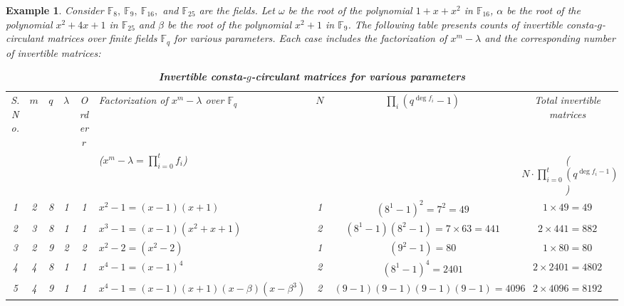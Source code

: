 \documentclass[12pt]{article}
\newtheorem{example}{Example}
\begin{document}
\begin{example}
Consider $\mathbb{F}_{8},~\mathbb{F}_{9},~\mathbb{F}_{16},$ and $\mathbb{F}_{25}$ are the fields. Let $\omega$ be the  root of the polynomial $1+x+x^2$ in $\mathbb{F}_{16}$, $\alpha$ be the root of the polynomial $x^2+4x+1$ in $\mathbb{F}_{25}$ and $\beta$ be the root of the polynomial $x^2+1$ in $\mathbb{F}_9$. 
The following table presents counts of invertible consta-$g$-circulant matrices over finite fields $\mathbb{F}_q$ for various parameters. Each case includes the factorization of $x^m - \lambda$ and the corresponding number of invertible matrices:

\begin{table}[ht]
	\centering
	\caption{\textbf{\textit{ Invertible consta-$g$-circulant matrices for various parameters}}}
	\label{6tab:consta_g_circulant_10}
	\vspace{.3cm}
	
	\tiny{\begin{tabular}{|c|c|c|c|c|l|c|c|c|}
		\hline
		S. No.&\(m\) & \(q\) & \(\lambda\) & Order \(r\) & Factorization of \(x^m-\lambda\) over \(\mathbb{F}_q\) & \(N\) & \(\prod_i (q^{\deg f_i} -1)\) & Total invertible matrices\\&~&~&~&~&($x^m-\lambda=\prod_{i=0}^{t}f_{i
		
		}$)&~&~&($N\cdot\prod_{i=0}^{t}(q^{\deg f_i-1})$) \\ \hline
		
		1&2 & 8  & 1 & 1 & \(x^2 - 1 = (x-1)(x+1)\)                         & 1 & \((8^1-1)^2 = 7^2=49\)               & \(1 \times 49 = 49\) \\ \hline
		
		2&3 & 8  & 1 & 1 & \(x^3 - 1 = (x-1)(x^2 + x +1)\)                  & 2 & \((8^1-1)(8^2-1) = 7 \times 63 = 441\) & \(2 \times 441 = 882\) \\ \hline
		
		3&2 & 9  & 2 & 2 & \(x^2 - 2 = (x^2-2)\)                  & 1 & \((9^2-1)   = 80\) & \(1 \times 80 = 80\) \\ \hline
		
		4&4 & 8  & 1 & 1 & \(x^4 - 1 = (x-1)^4\) & 2 & \((8^1-1)^4 = 2401 \) & \(2 \times 2401 = 4802\) \\ \hline
		
		5&4 & 9 & 1 & 1 & \(x^4 - 1 = (x-1)(x+1)(x-\beta)(x-\beta^3)\)                         & 2 & $(9-1)(9-1)(9-1)(9-1)=4096$          & \(2 \times 4096 = 8192\) \\ \hline
		

\end{tabular}}
\end{table}
\end{example}
\end{document}
